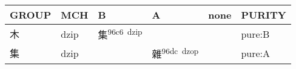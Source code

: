 \documentclass[14pt,a4paper]{scrartcl}
\begin{document}
\begin{longtable}[c]{@{}llllll@{}}
\toprule
\begin{minipage}[b]{0.14\columnwidth}\raggedright\strut
GROUP
\strut\end{minipage} &
\begin{minipage}[b]{0.14\columnwidth}\raggedright\strut
MCH
\strut\end{minipage} &
\begin{minipage}[b]{0.14\columnwidth}\raggedright\strut
B
\strut\end{minipage} &
\begin{minipage}[b]{0.14\columnwidth}\raggedright\strut
A
\strut\end{minipage} &
\begin{minipage}[b]{0.14\columnwidth}\raggedright\strut
none
\strut\end{minipage} &
\begin{minipage}[b]{0.14\columnwidth}\raggedright\strut
PURITY
\strut\end{minipage}\tabularnewline
\midrule
\endhead
\begin{minipage}[t]{0.14\columnwidth}\raggedright\strut
木
\strut\end{minipage} &
\begin{minipage}[t]{0.14\columnwidth}\raggedright\strut
dzip
\strut\end{minipage} &
\begin{minipage}[t]{0.14\columnwidth}\raggedright\strut
集\textsuperscript{96c6~dzip}
\strut\end{minipage} &
\begin{minipage}[t]{0.14\columnwidth}\raggedright\strut
\strut\end{minipage} &
\begin{minipage}[t]{0.14\columnwidth}\raggedright\strut
\strut\end{minipage} &
\begin{minipage}[t]{0.14\columnwidth}\raggedright\strut
pure:B
\strut\end{minipage}\tabularnewline
\begin{minipage}[t]{0.14\columnwidth}\raggedright\strut
集
\strut\end{minipage} &
\begin{minipage}[t]{0.14\columnwidth}\raggedright\strut
dzip
\strut\end{minipage} &
\begin{minipage}[t]{0.14\columnwidth}\raggedright\strut
\strut\end{minipage} &
\begin{minipage}[t]{0.14\columnwidth}\raggedright\strut
雜\textsuperscript{96dc~dzop}
\strut\end{minipage} &
\begin{minipage}[t]{0.14\columnwidth}\raggedright\strut
\strut\end{minipage} &
\begin{minipage}[t]{0.14\columnwidth}\raggedright\strut
pure:A
\strut\end{minipage}\tabularnewline
\bottomrule
\end{longtable}
\end{document}
